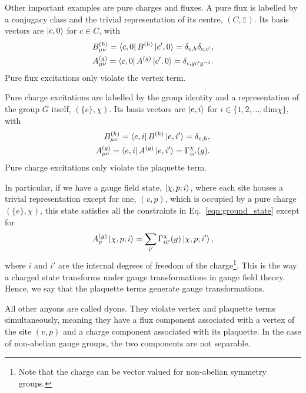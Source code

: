\documentclass[two column]{article}
\begin{document}
Other important examples are pure charges and fluxes. A pure flux is labelled by a conjugacy class and the trivial representation of its centre, $(C, \mathbb{1})$. Its basis vectors are $\ket{c, 0}$ for $c \in C$, with
\begin{equation}
    \begin{split}
        B^{(h)}_{\mu\nu}=\bra{c, 0} B^{(h)} \ket{c', 0} = \delta_{c, h} \delta_{c, c'}, \\
        A^{(g)}_{\mu\nu} = \bra{c, 0} A^{(g)} \ket{c', 0} = \delta_{c,gc'g^{-1}}.
    \end{split}
\end{equation}
Pure flux excitations only violate the vertex term.

Pure charge excitations are labelled by the group identity and a representation of the group $G$ itself, $(\{e\}, \chi)$. Its basis vectors are $\ket{e, i}$ for $i \in \{1, 2, \ldots, \text{dim}\chi\}$, with
\begin{equation}
    \begin{split}
        B^{(h)}_{\mu\nu}=\bra{e, i} B^{(h)} \ket{e, i'} = \delta_{e, h},\\
        A^{(g)}_{\mu\nu} = \bra{e, i} A^{(g)} \ket{e, i'} = \Gamma^\chi_{ii'}(g).
    \end{split}
\end{equation}
Pure charge excitations only violate the plaquette term.


In particular, if we have a gauge field state, $\ket{\chi, p; i}$, where each site houses a trivial representation except for one, $(v, p)$, which is occupied by a pure charge $(\{e\}, \chi)$, this state satisfies all the constraints in Eq.~\eqref{eqn:ground_state} except for
\begin{equation}
    A_p^{(g)}\ket{\chi, p; i} = \sum_{i'} \Gamma^\chi_{ii'}(g)\ket{\chi, p; i'},\label{eqn:tranfs}
\end{equation}
where $i$ and $i'$ are the internal degrees of freedom of the charge\footnote{Note that the charge can be vector valued for non-abelian symmetry groups.}.
This is the way a charged state transforms under gauge transformations in gauge field theory. Hence, we say that the plaquette terms generate gauge transformations.

All other anyons are called dyons. They violate vertex and plaquette terms simultaneously, meaning they have a flux component associated with a vertex of the site $(v,p)$ and a charge component associated with its plaquette. In the case of non-abelian gauge groups, the two components are not separable.
\end{document}
